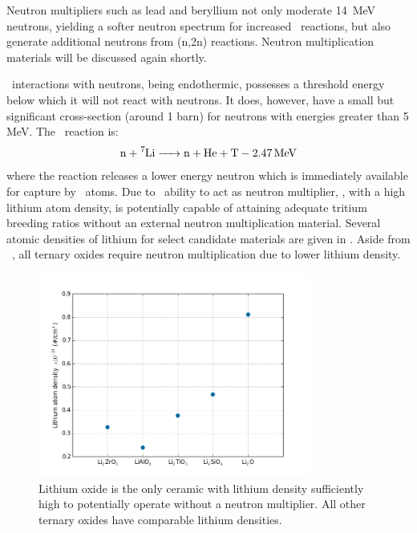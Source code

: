 \documentclass[11pt]{report} %
\newcommand{\lio}{\ce{Li2O}}
\newcommand{\lisev}{\ce{^7Li}}
\newcommand{\lisix}{\ce{^6Li}}
\begin{document}
Neutron multipliers such as lead and beryllium not only moderate \SI{14}{\mega\electronvolt} neutrons, yielding a softer neutron spectrum for increased \lisix~reactions, but also generate additional neutrons from (n,2n) reactions. Neutron multiplication materials will be discussed again shortly.

\lisev~interactions with neutrons, being endothermic, possesses a threshold energy below which it will not react with neutrons. It does, however, have a small but significant cross-section (around 1 barn) for neutrons with energies greater than 5 MeV. The \lisev~reaction is:
\begin{align}
\ce{n + ^7Li -> n + He + T}-\SI{2.47}{\mega\electronvolt}\label{eq:Li7T}
\end{align}
where the reaction releases a lower energy neutron which is immediately available for capture by \lisix~atoms. Due to \lisev~ability to act as neutron multiplier, \lio, with a high lithium atom density, is potentially capable of attaining adequate tritium breeding ratios without an external neutron multiplication material. Several atomic densities of lithium for select candidate materials are given in . Aside from \lio~, all ternary oxides require neutron multiplication due to lower lithium density.

\begin{figure}[ht]
\centering
\includegraphics[width=0.8\textwidth]{images/li-density} 
\caption{Lithium oxide is the only ceramic with lithium density sufficiently high to potentially operate without a neutron multiplier. All other ternary oxides have comparable lithium densities.}
\label{fig:li-density}
\end{figure}
\end{document}
